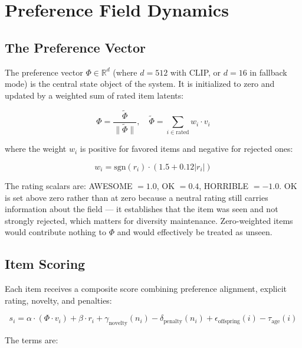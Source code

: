\documentclass[12pt, a4paper]{article}
\begin{document}
\section{Preference Field Dynamics}

\subsection{The Preference Vector}

The preference vector $\Phi \in \mathbb{R}^d$ (where $d = 512$ with CLIP, or $d = 16$ in fallback mode) is the central state object of the system. It is initialized to zero and updated by a weighted sum of rated item latents:

\begin{equation}
\Phi = \frac{\tilde{\Phi}}{\|\tilde{\Phi}\|}, \quad \tilde{\Phi} = \sum_{i \in \text{rated}} w_i \cdot v_i
\end{equation}

where the weight $w_i$ is positive for favored items and negative for rejected ones:

\begin{equation}
w_i = \text{sgn}(r_i) \cdot (1.5 + 0.12 |r_i|)
\end{equation}

The rating scalars are: AWESOME $= 1.0$, OK $= 0.4$, HORRIBLE $= -1.0$. OK is set above zero rather than at zero because a neutral rating still carries information about the field --- it establishes that the item was seen and not strongly rejected, which matters for diversity maintenance. Zero-weighted items would contribute nothing to $\Phi$ and would effectively be treated as unseen.

\subsection{Item Scoring}

Each item receives a composite score combining preference alignment, explicit rating, novelty, and penalties:

\begin{equation}
s_i = \alpha \cdot (\Phi \cdot v_i) + \beta \cdot r_i + \gamma_{\text{novelty}}(n_i) - \delta_{\text{penalty}}(n_i) + \epsilon_{\text{offspring}}(i) - \tau_{\text{age}}(i)
\end{equation}

The terms are:
\end{document}
